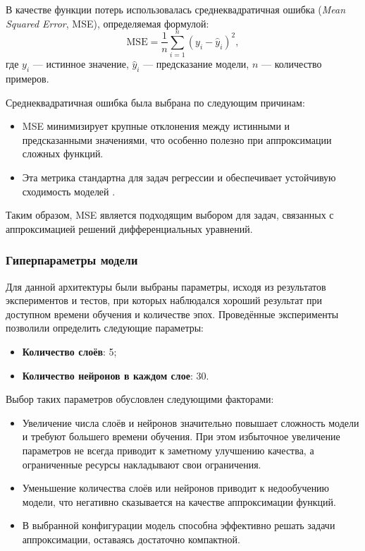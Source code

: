 В качестве функции потерь использовалась среднеквадратичная ошибка (\textit{Mean Squared Error}, MSE), определяемая формулой:
\[
\text{MSE} = \frac{1}{n} \sum_{i=1}^{n} (y_i - \hat{y}_i)^2,
\]
где \( y_i \) — истинное значение, \( \hat{y}_i \) — предсказание модели, \( n \) — количество примеров.

Среднеквадратичная ошибка была выбрана по следующим причинам:
\begin{itemize}
    \item MSE минимизирует крупные отклонения между истинными и предсказанными значениями, что особенно полезно при аппроксимации сложных функций.
    \item Эта метрика стандартна для задач регрессии и обеспечивает устойчивую сходимость моделей \cite{Goodfellow}.
\end{itemize}

Таким образом, MSE является подходящим выбором для задач, связанных с аппроксимацией решений дифференциальных уравнений.

\subsubsection{Гиперпараметры модели}

Для данной архитектуры были выбраны параметры, исходя из результатов экспериментов и тестов, при которых наблюдался хороший результат при доступном времени обучения и количестве эпох. Проведённые эксперименты позволили определить следующие параметры:
\begin{itemize}
    \item \textbf{Количество слоёв}: 5;
    \item \textbf{Количество нейронов в каждом слое}: 30.
\end{itemize}

Выбор таких параметров обусловлен следующими факторами:
\begin{itemize}
    \item Увеличение числа слоёв и нейронов значительно повышает сложность модели и требуют большего времени обучения. При этом избыточное увеличение параметров не всегда приводит к заметному улучшению качества, а ограниченные ресурсы накладывают свои ограничения.
    \item Уменьшение количества слоёв или нейронов приводит к недообучению модели, что негативно сказывается на качестве аппроксимации функций.
    \item В выбранной конфигурации модель способна эффективно решать задачи аппроксимации, оставаясь достаточно компактной.
\end{itemize}


